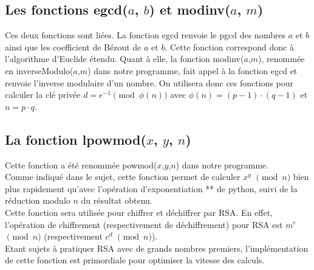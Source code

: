 \documentclass[12pt]{article}
\theoremstyle{definition}
\begin{document}
	\subsection{Les fonctions \textsf{egcd($a$, $b$)} et \textsf{modinv($a$, $m$)}}
	Ces deux fonctions sont liées. La fonction \textsf{egcd} renvoie le pgcd des nombres $a$ et $b$ ainsi que les coefficient de Bézout de $a$ et $b$. Cette fonction correspond donc à l'algorithme d'Euclide étendu. Quant à elle, la fonction \textsf{modinv($a$,$m$)}, renommée en \textsf{inverseModulo($a$,$m$)} dans notre programme, fait appel à la fonction \textsf{egcd} et renvoie l'inverse modulaire d'un nombre. On utilisera donc ces fonctions pour calculer la clé privée $d=e^{-1}  \pmod{\phi (n)}$ avec $\phi(n) = (p-1) \cdot (q-1)$ et $n = p \cdot q$.
	 \subsection{La fonction \textsf{lpowmod($x$, $y$, $n$)}}
Cette fonction a été renommée \textsf{powmod($x$,$y$,$n$)} dans notre programme.\\
	 Comme indiqué dans le sujet, cette fonction permet de calculer $x^y$ $\pmod{n}$ bien plus rapidement qu'avec l'opération d'exponentiation ** de python, suivi de la réduction modulo $n$ du résultat obtenu.\\
	 Cette fonction sera utilisée pour chiffrer et déchiffrer par RSA. En effet, l'opération de chiffrement (respectivement de déchiffrement) pour RSA est $m^e$ $\pmod{n}$ (respectivement $c^d$ $\pmod{n}$).\\
	 Etant sujets à pratiquer RSA avec de grands nombres premiers, l'implémentation de cette fonction est primordiale pour optimiser la vitesse des calculs.
\end{document}
